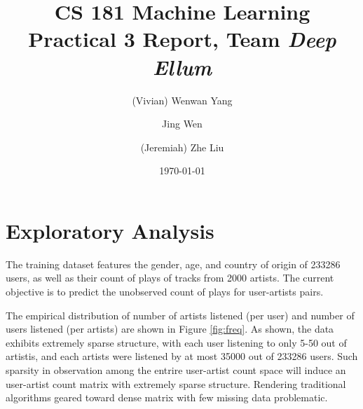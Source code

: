 \documentclass[11pt]{article}
\author[1]{(Vivian) Wenwan Yang}
\author[2]{Jing Wen}
\author[2]{(Jeremiah) Zhe Liu}
\affil[1]{Department of Computational Science and Engineering, SEAS}
\affil[2]{Department of Biostatistics, Harvard School of Public Health}
\theoremstyle{definition}
\begin{document}

\title{\textbf{CS 181 Machine Learning}\\ 
\textbf{Practical 3 Report, Team \textit{Deep Ellum}}}

\pretitle{\begin{centering}\Large}
\posttitle{\par\end{centering}}

\date{\today}
\vspace{-10em}
\maketitle
\vspace{-2em}




\section{\textbf{Exploratory Analysis}}\label{sec:EDA}

The training dataset features the gender, age, and country of origin of  233286 users, as well as their count of plays of tracks from 2000 artists.  The current objective is to predict the unobserved count of plays for user-artists pairs.

The empirical distribution of number of artists listened (per user) and  number of users listened (per artists) are shown in Figure \ref{fig:freq}. As shown, the data exhibits extremely sparse structure, with each user listening to only 5-50 out of artistis, and each artists were listened by at most 35000 out of 233286 users. Such sparsity in observation among the entrire user-artist count space will induce an user-artist count matrix with extremely sparse structure. Rendering traditional algorithms geared toward dense matrix with few missing data problematic.
\end{document}
